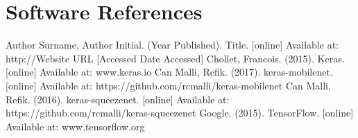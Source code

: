 \documentclass{article}
\begin{document}
{\begin{enumerate}
\end{enumerate}

\section*{Software References}
Author Surname, Author Initial. (Year Published). Title. [online] Available at: http://Website URL [Accessed Date Accessed]
Chollet, Francois. (2015). Keras. [online] Available at: www.keras.io
Can Malli, Refik. (2017). keras-mobilenet. [online] Available at: https://github.com/rcmalli/keras-mobilenet
Can Malli, Refik. (2016). keras-squeezenet. [online] Available at: https://github.com/rcmalli/keras-squeezenet
Google. (2015). TensorFlow. [online] Available at: www.tensorflow.org









}
\end{document}
